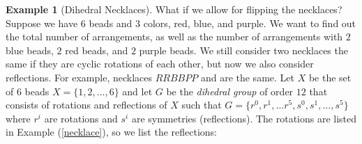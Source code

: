 \documentclass[psamsfonts]{amsart}
\theoremstyle{definition}
\newtheorem{exmp}[thm]{Example}
\theoremstyle{remark}
\numberwithin{equation}{section}
\begin{document}
\begin{exmp}[Dihedral Necklaces]\hfill

What if we allow for flipping the necklaces? Suppose we have $6$ beads and $3$ colors, red, blue, and purple. We want to find out the total number of arrangements, as well as the number of arrangements with $2$ blue beads, $2$ red beads, and $2$ purple beads. We still consider two necklaces the same if they are cyclic rotations of each other, but now we also consider reflections. For example,
necklaces $RRBBPP$ and  are the same. Let $X$ be the set of $6$ beads $X=\{1,2,\dots, 6\}$ and let $G$ be the \textit{dihedral group} of order $12$ that consists of rotations and reflections of $X$ such that $G=\{r^0,r^1,\dots r^5,s^0,s^1,\dots,s^5\}$ where $r^i$ are rotations and $s^i$ are symmetries (reflections). The rotations are listed in Example (\ref{necklace}), so we list the reflections:   
\end{exmp}
\end{document}
